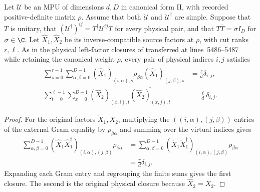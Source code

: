 \begin{lemma}
    \label{thm:mpug_inverse_source_x_physical}
    \leanok
    Let $\mathcal U$ be an MPU of dimensions $d,D$ in canonical form II,
    with recorded positive-definite matrix $\rho$. Assume that both
    $\mathcal U$ and $\mathcal U^\dagger$ are simple. Suppose that $T$
    is unitary, that $(\mathcal U^\dagger)^{ij}=T^\dagger\mathcal U^{ij}T$
    for every physical pair, and that $T\overline T=\sigma I_D$ for
    $\sigma\in\C$. Let $\widehat X_1,\widehat X_2$ be its
    inverse-compatible source factors at $\rho$, with cut ranks $r,\ell$.
    As in the physical left-factor closures of
    \cite[lines~1120--1162]{FrancoRubio2025MPUGauging} transferred at
    lines~5486--5487 while retaining the canonical weight $\rho$, every pair of
    physical indices $i,j$ satisfies
    \begin{align}
        \sum_{s=0}^{r-1}\sum_{\alpha,\beta=0}^{D-1}
        (\widehat X_1)_{(i,\alpha),s}\rho_{\beta\alpha}
        \overline{(\widehat X_1)_{(j,\beta),s}}
         & =\frac{r}{d}\delta_{i,j},    \\
        \sum_{t=0}^{\ell-1}\sum_{x=0}^{D-1}
        (\widehat X_2)_{(x,i),t}\overline{(\widehat X_2)_{(x,j),t}}
         & =\frac{\ell}{d}\delta_{i,j}.
    \end{align}
\end{lemma}
\begin{proof}\leanok
    For the original factors $\widetilde X_1,X_2$, multiplying the
    $((i,\alpha),(j,\beta))$ entries of the external Gram equality by
    $\rho_{\beta\alpha}$ and summing over the virtual indices gives
    \begin{align}
        \sum_{\alpha,\beta=0}^{D-1}
        (\widehat X_1\widehat X_1^\dagger)_{(i,\alpha),(j,\beta)}
        \rho_{\beta\alpha}
         & =\sum_{\alpha,\beta=0}^{D-1}
        (\widetilde X_1\widetilde X_1^\dagger)_{(i,\alpha),(j,\beta)}
        \rho_{\beta\alpha}              \\
         & =\frac{r}{d}\delta_{i,j}.
    \end{align}
    Expanding each Gram entry and regrouping the finite sums gives the
    first closure. The second is the original physical closure because
    $\widehat X_2=X_2$.
\end{proof}

